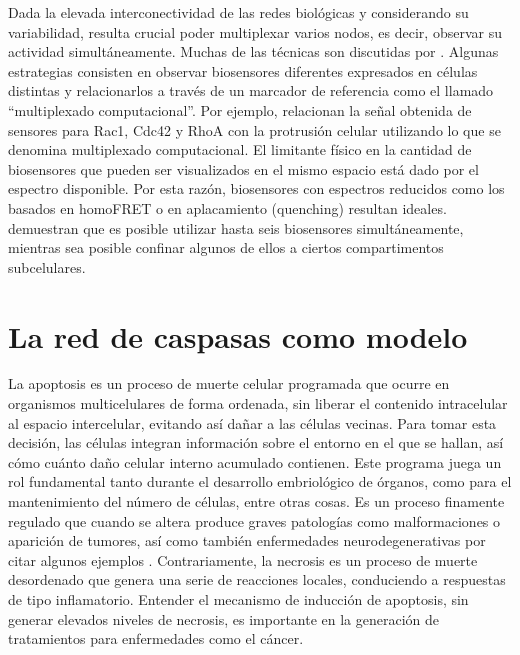 Dada la elevada interconectividad de las redes biológicas y considerando su variabilidad, resulta crucial poder multiplexar varios nodos, es decir, observar su actividad simultáneamente. Muchas de las técnicas son discutidas por \cite{Grecco2016}. Algunas estrategias consisten en observar biosensores diferentes expresados en células distintas y relacionarlos a través de un marcador de referencia como el llamado ``multiplexado computacional''. Por ejemplo, \cite{Machacek2009} relacionan la señal obtenida de sensores para Rac1, Cdc42 y RhoA con la protrusión celular utilizando lo que se denomina multiplexado computacional. El limitante físico en la cantidad de biosensores que pueden ser visualizados en el mismo espacio está dado por el espectro disponible. Por esta razón, biosensores con espectros reducidos como los basados en homoFRET o en aplacamiento (quenching) resultan ideales. \cite{Mehta2018b} demuestran que es posible utilizar hasta seis biosensores simultáneamente, mientras sea posible confinar algunos de ellos a ciertos compartimentos subcelulares.


\section{La red de caspasas como modelo}
\label{sec:intro:CascadaApoptotica}



La apoptosis es un proceso de muerte celular programada que ocurre en organismos multicelulares de forma ordenada, sin liberar el contenido intracelular al espacio intercelular, evitando así dañar a las células vecinas. Para tomar esta decisión, las células integran información sobre el entorno en el que se hallan, así cómo cuánto daño celular interno acumulado contienen. Este programa juega un rol fundamental tanto durante el desarrollo embriológico de órganos, como para el mantenimiento del número de células, entre otras cosas. Es un proceso finamente regulado que cuando se altera produce graves patologías como malformaciones o aparición de tumores, así como también enfermedades neurodegenerativas por citar algunos ejemplos \citep{Kominami2012}. Contrariamente, la necrosis es un proceso de muerte desordenado que genera una serie de reacciones locales, conduciendo a respuestas de tipo inflamatorio. Entender el mecanismo de inducción de apoptosis, sin generar elevados niveles de necrosis, es importante en la generación de tratamientos para enfermedades como el cáncer.

